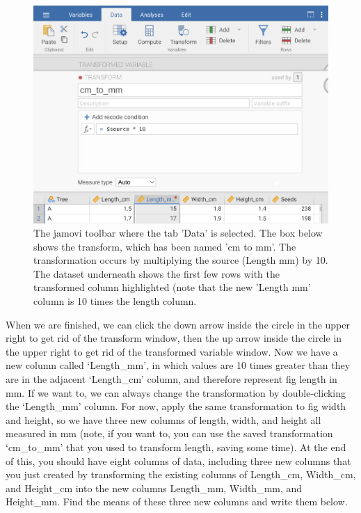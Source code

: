 \documentclass[
]{scrbook}
\begin{document}
\begin{figure}
\includegraphics[width=1\linewidth]{img/jamovi_transform_cm_to_mm} \caption{The jamovi toolbar where the tab 'Data' is selected. The box below shows the transform, which has been named 'cm to mm'. The transformation occurs by multiplying the source (Length mm) by 10. The dataset underneath shows the first few rows with the transformed column highlighted (note that the new 'Length mm' column is 10 times the length column.}\label{fig:unnamed-chunk-31}
\end{figure}

When we are finished, we can click the down arrow inside the circle in the upper right to get rid of the transform window, then the up arrow inside the circle in the upper right to get rid of the transformed variable window.
Now we have a new column called `Length\_mm', in which values are 10 times greater than they are in the adjacent `Length\_cm' column, and therefore represent fig length in mm.
If we want to, we can always change the transformation by double-clicking the `Length\_mm' column.
For now, apply the same transformation to fig width and height, so we have three new columns of length, width, and height all measured in mm (note, if you want to, you can use the saved transformation `cm\_to\_mm' that you used to transform length, saving some time).
At the end of this, you should have eight columns of data, including three new columns that you just created by transforming the existing columns of Length\_cm, Width\_cm, and Height\_cm into the new columns Length\_mm, Width\_mm, and Height\_mm.
Find the means of these three new columns and write them below.
\end{document}
